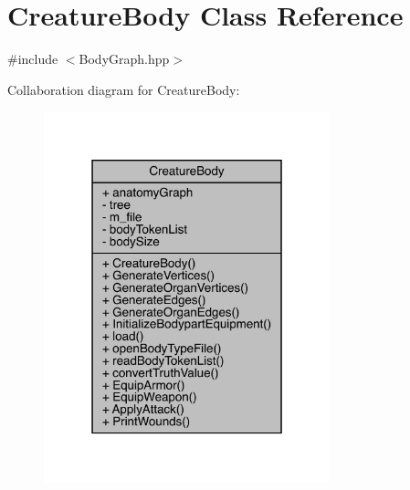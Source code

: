 \hypertarget{class_creature_body}{}\section{Creature\+Body Class Reference}
\label{class_creature_body}


{\ttfamily \#include $<$Body\+Graph.\+hpp$>$}



Collaboration diagram for Creature\+Body\+:
\nopagebreak
\begin{figure}[H]
\begin{center}
\leavevmode
\includegraphics[width=235pt]{class_creature_body__coll__graph}
\end{center}
\end{figure}
